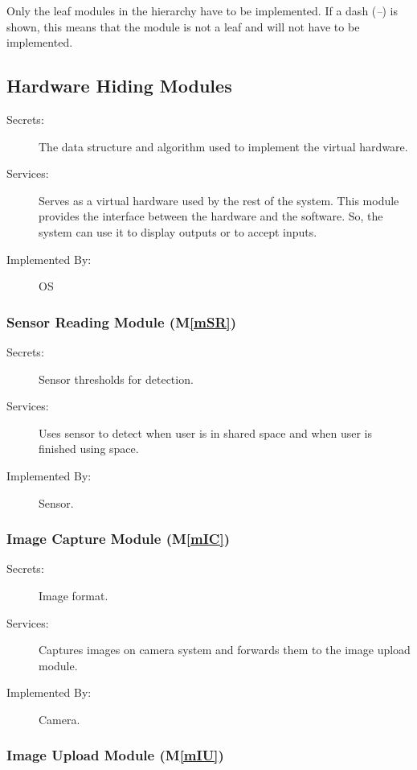\documentclass[12pt, titlepage]{article}
\newcommand{\mref}[1]{M\ref{#1}}
\begin{document}
Only the leaf modules in the hierarchy have to be implemented. If a dash
(\emph{--}) is shown, this means that the module is not a leaf and will not have
to be implemented.

\subsection{Hardware Hiding Modules}

\begin{description}
\item[Secrets:]The data structure and algorithm used to implement the virtual hardware.
\item[Services:]Serves as a virtual hardware used by the rest of the system. This module provides the interface between the hardware and the software. So, the system can use it to display outputs or to accept inputs.
\item[Implemented By:] OS
\end{description}

\subsubsection{Sensor Reading Module (\mref{mSR})}

\begin{description}
\item[Secrets:]Sensor thresholds for detection.
\item[Services:]Uses sensor to detect when user is in shared space and when user is finished using space.
\item[Implemented By:] Sensor.
\end{description}

\subsubsection{Image Capture Module (\mref{mIC})}

\begin{description}
\item[Secrets:] Image format.
\item[Services:]Captures images on camera system and forwards them to the image upload module.
\item[Implemented By:] Camera.
\end{description}

\subsubsection{Image Upload Module (\mref{mIU})}
\end{document}
